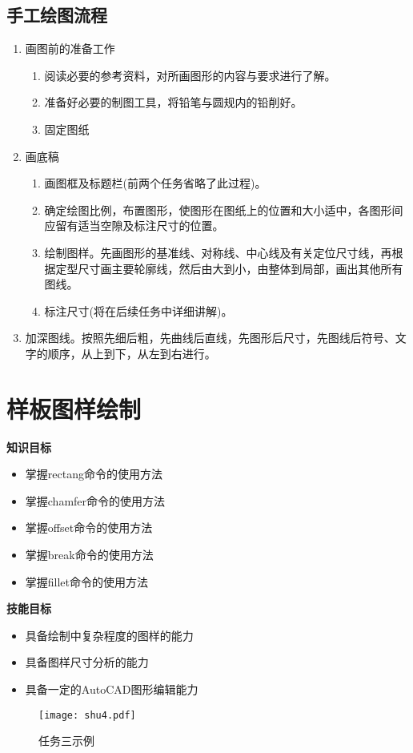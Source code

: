 \subsection{手工绘图流程}
\begin{enumerate}
\item 画图前的准备工作
    \begin{enumerate}
    \item 阅读必要的参考资料，对所画图形的内容与要求进行了解。
    \item 准备好必要的制图工具，将铅笔与圆规内的铅削好。
    \item 固定图纸
    \end{enumerate}
\item 画底稿
\begin{enumerate}
\item 画图框及标题栏(前两个任务省略了此过程)。
\item 确定绘图比例，布置图形，使图形在图纸上的位置和大小适中，各图形间应留有适当空隙及标注尺寸的位置。
\item 绘制图样。先画图形的基准线、对称线、中心线及有关定位尺寸线，再根据定型尺寸画主要轮廓线，然后由大到小，由整体到局部，画出其他所有图线。
\item 标注尺寸(将在后续任务中详细讲解)。
\end{enumerate}
\item 加深图线。按照先细后粗，先曲线后直线，先图形后尺寸，先图线后符号、文字的顺序，从上到下，从左到右进行。

\end{enumerate}
\clearpage

\section{样板图样绘制}\label{sec:yangban}
{\bfseries 知识目标}
\begin{itemize}
\item 掌握rectang命令的使用方法
\item 掌握chamfer命令的使用方法
\item 掌握offset命令的使用方法
\item 掌握break命令的使用方法
\item 掌握fillet命令的使用方法
\end{itemize}
{\bfseries 技能目标}
\begin{itemize}
\item 具备绘制中复杂程度的图样的能力
\item 具备图样尺寸分析的能力
\item 具备一定的AutoCAD图形编辑能力
\end{itemize}
\begin{figure}[htbp]
\centering
\texttt{[image: shu4.pdf]}
\caption{任务三示例}\label{fig:renwu3}
\end{figure}
